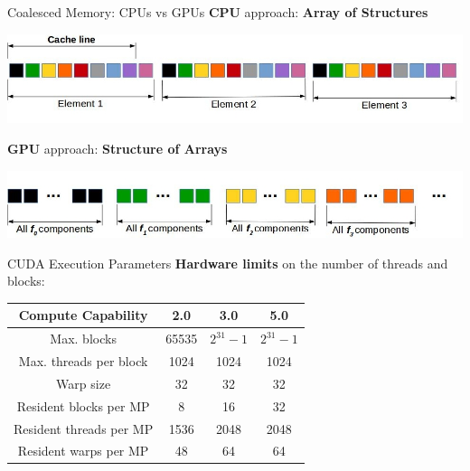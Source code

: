 \documentclass[9pt]{beamer}
\newcommand{\emphasize}[1]{\textbf{\color{red} #1 } }
\begin{document}
\begin{frame}{Coalesced Memory: CPUs vs GPUs}
\textbf{CPU} approach: \emphasize{Array of Structures}
\begin{center}
\includegraphics[scale=0.3]{images/coalesced-memory-access-2.jpg} %
\end{center}

\textbf{GPU} approach: \emphasize{Structure of Arrays}
\begin{center}
\includegraphics[scale=0.3]{images/coalesced-memory-access-1.jpg} %
\end{center}
\end{frame}
\begin{frame}[t]{CUDA Execution Parameters}
\textbf{Hardware limits} on the number of threads and blocks: 

\bigskip

\begin{center}

\begin{tabular}{|c|c|c|c|}
\hline
Compute Capability & 2.0 & 3.0 & 5.0 \\
\hline
Max. blocks & 65535 & $2^{31}-1$ & $2^{31}-1$ \\
\hline
Max. threads per block & 1024 & 1024 & 1024 \\
\hline
Warp size & 32 & 32 & 32 \\ 
\hline
Resident blocks per MP & 8 & 16 & 32 \\ 
\hline
Resident threads per MP & 1536 & 2048 & 2048 \\
\hline
Resident warps per MP & 48 & 64 & 64 \\ 
\hline

\end{tabular}
\end{center}

\end{frame}
\end{document}
